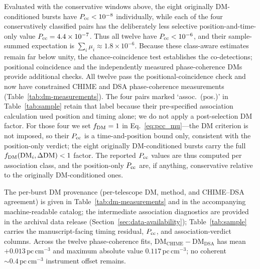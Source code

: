 Evaluated with the conservative windows above, the eight originally
DM-conditioned bursts
have $P_{\rm cc}<10^{-8}$ individually, while each of the four conservatively
classified pairs has the deliberately less selective position-and-time-only
value $P_{\rm cc}=4.4\times10^{-7}$. Thus all twelve have $P_{\rm cc}<10^{-6}$,
and their sample-summed expectation is $\sum_i\mu_i\approx1.8\times10^{-6}$.
Because these class-aware estimates remain far below unity, the
chance-coincidence test establishes the co-detections; positional coincidence
and the independently measured phase-coherence DMs provide additional checks.
All twelve pass the positional-coincidence check and now have constrained
CHIME and DSA phase-coherence measurements (Table~\ref{tab:dm-measurements}).
The four pairs marked `assoc.~(pos.)' in Table~\ref{tab:sample} retain that
label because their pre-specified association calculation used position and
timing alone; we do not apply a post-selection DM factor. For those four we set
$f_{\rm DM}=1$ in
Eq.~\eqref{eq:pcc_mu}---the DM criterion is not imposed, so their
$P_{\rm cc}$ is a time-and-position bound only, consistent with the
position-only verdict; the eight originally DM-conditioned bursts carry the full
$f_{\rm DM}(\mathrm{DM}_i,\Delta\mathrm{DM})<1$ factor. The reported
$P_{\rm cc}$ values are thus computed per association class, and the
position-only $P_{\rm cc}$ are, if anything, conservative relative to the
originally DM-conditioned ones.

The per-burst DM provenance (per-telescope DM, method, and CHIME--DSA agreement)
is given in Table~\ref{tab:dm-measurements} and in the accompanying
machine-readable catalog; the intermediate association diagnostics are
provided in the archival data release (Section~\ref{sec:data-availability});
Table~\ref{tab:sample} carries the manuscript-facing timing residual, $P_{\rm cc}$,
and association-verdict columns. Across the twelve phase-coherence fits,
$\mathrm{DM_{CHIME}}-\mathrm{DM_{DSA}}$ has mean
$+0.013\,\mathrm{pc\,cm^{-3}}$ and maximum absolute value
$0.117\,\mathrm{pc\,cm^{-3}}$; no coherent $\sim0.4\,\mathrm{pc\,cm^{-3}}$
instrument offset remains.
